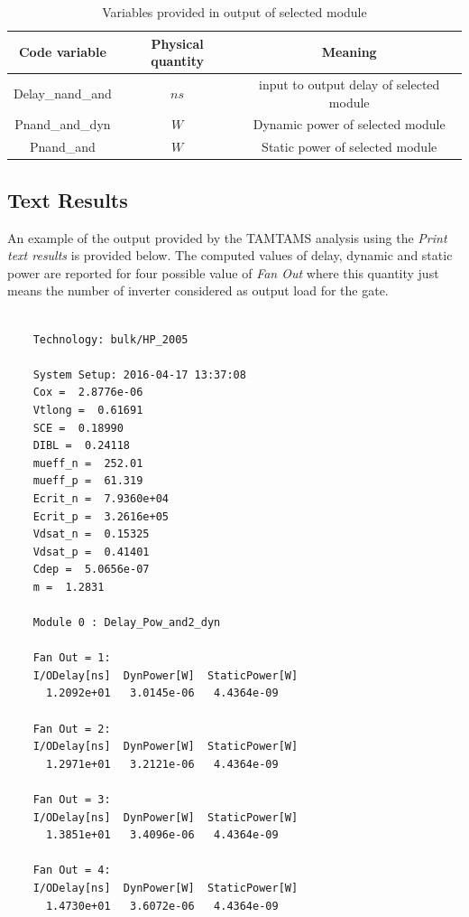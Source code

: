 \documentclass[12pt,  english, makeidx, a4paper, titlepage, oneside]{article}
\begin{document}
\begin{table}[htbp]
	\begin{center}
		\begin{tabular}{|c|c|c|}
			\hline
			Code variable & Physical quantity & Meaning\\
			\hline
			Delay\_nand\_and & $ns$ & input to output delay of selected module\\
			\hline
			Pnand\_and\_dyn & $W$ & Dynamic power of selected module\\
			\hline
			Pnand\_and  & $W$ & Static power of selected module\\
			\hline
		\end{tabular}
	\end{center}
	\caption{Variables provided in output of selected module}
	\label{tab:output_var}
\end{table}
\newpage
\subsection{Text Results}
An example of the output provided by the TAMTAMS analysis using the \textit{Print text results} is provided below.
The computed values of delay, dynamic and static power are reported for four possible value of \textit{Fan Out} where this quantity just means the number of inverter considered as output load for the gate.
\footnotesize
\begin{verbatim}

    Technology: bulk/HP_2005 

    System Setup: 2016-04-17 13:37:08 
    Cox =  2.8776e-06
    Vtlong =  0.61691
    SCE =  0.18990
    DIBL =  0.24118
    mueff_n =  252.01
    mueff_p =  61.319
    Ecrit_n =  7.9360e+04
    Ecrit_p =  3.2616e+05
    Vdsat_n =  0.15325
    Vdsat_p =  0.41401
    Cdep =  5.0656e-07
    m =  1.2831
    
    Module 0 : Delay_Pow_and2_dyn 
    
    Fan Out = 1:
    I/ODelay[ns]  DynPower[W]  StaticPower[W]
      1.2092e+01   3.0145e-06   4.4364e-09

    Fan Out = 2:
    I/ODelay[ns]  DynPower[W]  StaticPower[W]
      1.2971e+01   3.2121e-06   4.4364e-09
    
    Fan Out = 3:
    I/ODelay[ns]  DynPower[W]  StaticPower[W]
      1.3851e+01   3.4096e-06   4.4364e-09

    Fan Out = 4:
    I/ODelay[ns]  DynPower[W]  StaticPower[W]
      1.4730e+01   3.6072e-06   4.4364e-09
\end{verbatim}
\normalsize
\end{document}
